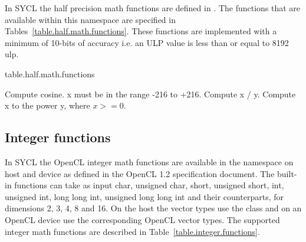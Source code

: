 In SYCL the half precision math functions are defined in . The functions that are available within this namespace are specified in Tables~\ref{table.half.math.functions}. These
functions are implemented with a minimum of 10-bits of accuracy i.e. an ULP value is less than or equal to 8192 ulp.

{table.half.math.functions}

{
Compute cosine. x must be in the range -216 to +216.
}
{
Compute x / y.
}
{
Compute x to the power y, where $x >= 0$.
}
\completeTable

\subsection{Integer functions}
In SYCL the OpenCL integer math functions are available in the namespace
 on host and device as defined in the OpenCL 1.2 specification
document\cite[par. 6.12.3] {opencl12}. The built-in functions can take as input
char, unsigned char, short, unsigned short, int, unsigned int, long long int,
unsigned long long int and their  counterparts, for dimensions 2,
3, 4, 8 and 16. On the host the vector types use the
 class and on an OpenCL device use the
corresponding OpenCL vector types. The supported integer math functions are
described in Table~\ref{table.integer.functions}.

